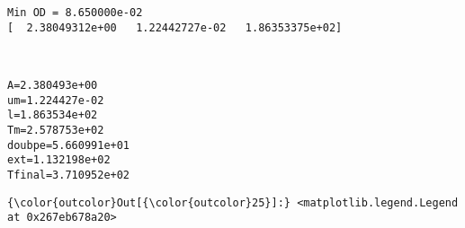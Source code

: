 \documentclass[11pt]{article}
\begin{document}
    \begin{Verbatim}[commandchars=\\\{\}]
Min OD = 8.650000e-02
[  2.38049312e+00   1.22442727e-02   1.86353375e+02]

    \end{Verbatim}

    \begin{center}
    \end{center}
    { \hspace*{\fill} \\}
    
    \begin{Verbatim}[commandchars=\\\{\}]
A=2.380493e+00
um=1.224427e-02
l=1.863534e+02
Tm=2.578753e+02
doubpe=5.660991e+01
ext=1.132198e+02
Tfinal=3.710952e+02

    \end{Verbatim}

            \begin{Verbatim}[commandchars=\\\{\}]
{\color{outcolor}Out[{\color{outcolor}25}]:} <matplotlib.legend.Legend at 0x267eb678a20>
\end{Verbatim}
        
    \begin{center}
    \end{center}
    { \hspace*{\fill} \\}
    
    \begin{center}
    \end{center}
    { \hspace*{\fill} \\}
    
\end{document}
